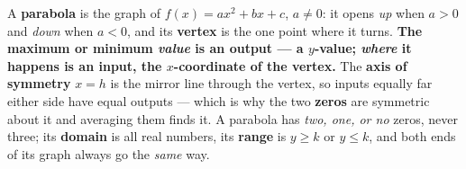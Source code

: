 \documentclass[12pt]{article}
\begin{document}
\vspace{0.14in}

\boxguard[8]
\begin{remindbox}
\small
A \textbf{parabola} is the graph of $f(x)=ax^2+bx+c$, $a\ne0$: it opens \emph{up} when $a>0$ and
\emph{down} when $a<0$, and its \textbf{vertex} is the one point where it turns. \textbf{The
maximum or minimum \emph{value} is an output --- a $y$-value; \emph{where} it happens is an input,
the $x$-coordinate of the vertex.} The \textbf{axis of symmetry} $x=h$ is the mirror line through
the vertex, so inputs equally far either side have equal outputs --- which is why the two
\textbf{zeros} are symmetric about it and averaging them finds it. A parabola has \emph{two, one,
or no} zeros, never three; its \textbf{domain} is all real numbers, its \textbf{range} is $y\ge k$
or $y\le k$, and both ends of its graph always go the \emph{same} way.
\end{remindbox}
\end{document}
